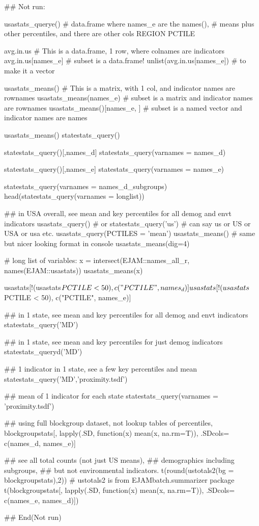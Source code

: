 \documentclass[a4paper]{book}
\begin{document}
\begin{Examples}
\begin{ExampleCode}
## Not run: 

usastats_querye() 
#  data.frame where names_e are the names(), 
#  means plus other percentiles, and there are other cols REGION PCTILE

avg.in.us                # This is a data.frame, 1 row, where colnames are indicators
avg.in.us[names_e]          # subset is a data.frame!
unlist(avg.in.us[names_e])  # to make it a vector

usastats_means()        # This is a matrix, with 1 col, and indicator names are rownames
usastats_means(names_e)     # subset is a matrix        and indicator names are rownames
usastats_means()[names_e, ] # subset is a named vector  and indicator names are  names

usastats_means()
statestats_query()

statestats_query()[,names_d]
statestats_query(varnames = names_d)

statestats_query()[,names_e]
statestats_query(varnames = names_e)

statestats_query(varnames = names_d_subgroups)
head(statestats_query(varnames = longlist))

## in USA overall, see mean and key percentiles for all demog and envt indicators
usastats_query() # or statestats_query('us') # can say us or US or USA or usa etc.
usastats_query(PCTILES = 'mean')
usastats_means() # same but nicer looking format in console
usastats_means(dig=4)

# long list of variables:
x = intersect(EJAM::names_all_r,  names(EJAM::usastats))
usastats_means(x)

usastats[!(usastats$PCTILE < 50), c("PCTILE", names_d)]
usastats[!(usastats$PCTILE < 50), c("PCTILE", names_e)]

## in 1 state, see mean and key percentiles for all demog and envt indicators
statestats_query('MD')

## in 1 state, see mean and key percentiles for just demog indicators
statestats_queryd('MD')

## 1 indicator in 1 state, see a few key percentiles and mean
statestats_query('MD','proximity.tsdf')

## mean of 1 indicator for each state
statestats_query(varnames = 'proximity.tsdf')

## using full blockgroup dataset, not lookup tables of percentiles, 
blockgroupstats[, lapply(.SD, function(x) mean(x, na.rm=T)),  .SDcols= c(names_d, names_e)]

##   see all total counts (not just US means), 
##   demographics including subgroups, 
##   but not environmental indicators.
t(round(ustotals2(bg = blockgroupstats),2)) #  ustotals2 is from EJAMbatch.summarizer package
t(blockgroupstats[, lapply(.SD, function(x) mean(x, na.rm=T)),
    .SDcols= c(names_e, names_d)])


## End(Not run)

\end{ExampleCode}
\end{Examples}
\end{document}

